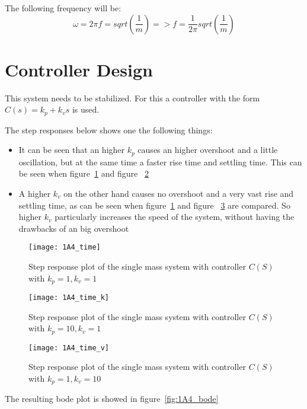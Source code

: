 \documentclass[report.tex]{subfiles}
\begin{document}
The following frequency will be:
\begin{equation}
\label{eq:ex1a_tf_freq_2}
\omega = 2\pi f = sqrt(\frac{1}{m}) => f = \frac{1}{2\pi}sqrt(\frac{1}{m}) 
\end{equation}

\newpage
\section{Controller Design}
This system needs to be stabilized. For this a controller with the form $C(s) = k_p + k_v s$ is used.

The step responses below shows one the following things: 
\begin{itemize}
\item{It can be seen that an higher $k_p$ causes an higher overshoot and a little oscillation, but at the same time a faster rise time and settling time. This can be seen when figure~\ref{fig:1A4_time} and figure ~\ref{fig:1A4_time_k}}
\item{A higher $k_v$ on the other hand causes no overshoot and a very vast rise and settling time, as can be seen when figure~\ref{fig:1A4_time} and figure ~\ref{fig:1A4_time_v} are compared. So higher $k_v$ particularly increases the speed of the system, without having the drawbacks of an big overshoot} 
\end{itemize}

\begin{figure}
  \centering
\texttt{[image: 1A4\_time]}
\caption{Step response plot of the single mass system with controller $C(S)$ with  $k_p = 1, k_v = 1$}
\label{fig:1A4_time}
\end{figure}

\begin{figure}
  \centering
\texttt{[image: 1A4\_time\_k]}
\caption{Step response plot of the single mass system with controller $C(S)$ with  $k_p = 10, k_v = 1$}
\label{fig:1A4_time_k}
\end{figure}

\begin{figure}[H]
  \centering
\texttt{[image: 1A4\_time\_v]}
\caption{Step response plot of the single mass system with controller $C(S)$ with  $k_p = 1, k_v = 10$}
\label{fig:1A4_time_v}
\end{figure}

The resulting bode plot is showed in figure~\ref{fig:1A4_bode}
\end{document}
